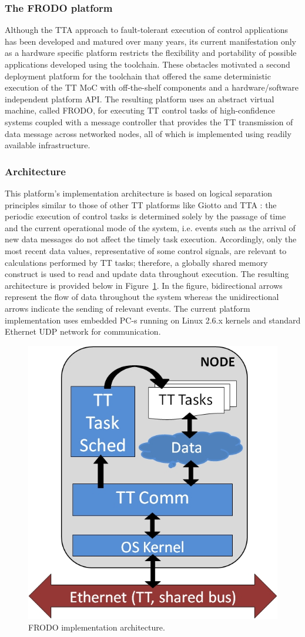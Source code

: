 \subsubsection{The FRODO platform}

Although the TTA approach to fault-tolerant execution of control applications has been developed and matured over many years, its current manifestation only as a hardware specific platform restricts the flexibility and portability of possible applications developed using the toolchain.  These obstacles motivated a second deployment platform for the toolchain that offered the same deterministic execution of the TT MoC with off-the-shelf components and a hardware/software independent platform API.  The resulting platform uses an abstract virtual machine, called FRODO, for executing TT control tasks of high-confidence systems coupled with a message controller that provides the TT transmission of data message across networked nodes, all of which is implemented using readily available infrastructure.

\subsubsection*{Architecture}

This platform's implementation architecture is based on logical separation principles similar to those of other TT platforms like Giotto \cite{henzinger01giotto} and TTA \cite{kopetz:2001-22}:  the periodic execution of control tasks is determined solely by the passage of time and the current operational mode of the system, i.e. events such as the arrival of new data messages do not affect the timely task execution.  Accordingly, only the most recent data values, representative of some control signals, are relevant to calculations performed by TT tasks; therefore, a globally shared memory construct is used to read and update data throughout execution.  The resulting architecture is provided below in Figure~\ref{fig:FRODOArch}.  In the figure, bidirectional arrows represent the flow of data throughout the system whereas the unidirectional arrows indicate the sending of relevant events.  The current platform implementation uses embedded PC-s running on Linux 2.6.x kernels and standard Ethernet UDP network for communication.

\begin{figure}[h]
  \centering
   \includegraphics[width=0.5\columnwidth]{FRODOArch}
   \caption{FRODO implementation architecture.}
   \label{fig:FRODOArch}
\end{figure}

